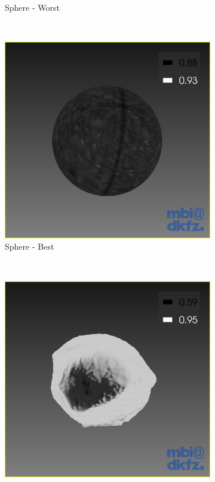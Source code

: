 \begin{figure}[H]
\begin{subfigure}[b]{0.32\textwidth}
    \caption*{Sphere - Worst}
    \label{fig:sphereworst}
  \end{subfigure}%
  ~ %
  \begin{subfigure}[b]{0.32\textwidth}
    \includegraphics[width=\textwidth]{images/surface/sphere_best.png}
    \caption*{Sphere - Best}
    \label{fig:spherebest}  
  \end{subfigure}
  ~ %
  \begin{subfigure}[b]{0.32\textwidth}
    \includegraphics[width=\textwidth]{images/surface/surface_average.png}

\end{subfigure}
\end{figure}
